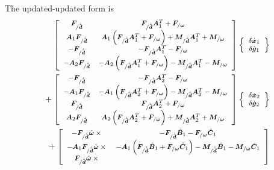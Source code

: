 \documentclass[10pt,dvips,fleqn,subeqn]{report}
\newcommand{\T}[1]{\bm{#1}}
\newcommand{\TT}[1]{\bm{#1}}
\begin{document}
The updated-updated form is
\begin{align}
	\footnotesize
	\sqbr{\matr{cc}{
		\T{F}_{/\dot{\tilde{\T{d}}}} 
		& \T{F}_{/\dot{\tilde{\T{d}}}} \TT{A}_1^T
			+ \T{F}_{/\T{\omega}}
		\\
%
		\TT{A}_1 \T{F}_{/\dot{\tilde{\T{d}}}} 
		& \TT{A}_1 \plbr{
			\T{F}_{/\dot{\tilde{\T{d}}}} \TT{A}_1^T
			+ \T{F}_{/\T{\omega}}
		}
			+ \T{M}_{/\dot{\tilde{\T{d}}}} \TT{A}_1^T
			+ \T{M}_{/\T{\omega}}
		\\
%
		- \T{F}_{/\dot{\tilde{\T{d}}}} 
		& - \T{F}_{/\dot{\tilde{\T{d}}}} \TT{A}_1^T
			- \T{F}_{/\T{\omega}}
		\\
%
		- \TT{A}_2 \T{F}_{/\dot{\tilde{\T{d}}}} 
		& - \TT{A}_2 \plbr{
			\T{F}_{/\dot{\tilde{\T{d}}}} \TT{A}_1^T
			+ \T{F}_{/\T{\omega}}
		}
			- \T{M}_{/\dot{\tilde{\T{d}}}} \TT{A}_1^T
			- \T{M}_{/\T{\omega}}
	}} \cubr{\cvvect{
		\delta\dot{\T{x}}_1 \\
		\delta\dot{\T{g}}_1
	}} & \nonumber \\
	\footnotesize
	\mbox{} + \sqbr{\matr{cc}{
		- \T{F}_{/\dot{\tilde{\T{d}}}}
		& - \T{F}_{/\dot{\tilde{\T{d}}}} \TT{A}_2^T
			- \T{F}_{/\T{\omega}}
		\\
%
		- \TT{A}_1 \T{F}_{/\dot{\tilde{\T{d}}}}
		& - \TT{A}_1 \plbr{
			\T{F}_{/\dot{\tilde{\T{d}}}} \TT{A}_2^T
			+ \T{F}_{/\T{\omega}}
		}
			- \T{M}_{/\dot{\tilde{\T{d}}}} \TT{A}_2^T
			- \T{M}_{/\T{\omega}}
		\\
%
		\T{F}_{/\dot{\tilde{\T{d}}}}
		& \T{F}_{/\dot{\tilde{\T{d}}}} \TT{A}_2^T
			+ \T{F}_{/\T{\omega}}
		\\
%
		\TT{A}_2 \T{F}_{/\dot{\tilde{\T{d}}}}
		& \TT{A}_2 \plbr{
			\T{F}_{/\dot{\tilde{\T{d}}}} \TT{A}_2^T
			+ \T{F}_{/\T{\omega}}
		}
			+ \T{M}_{/\dot{\tilde{\T{d}}}} \TT{A}_2^T
			+ \T{M}_{/\T{\omega}}
	}} \cubr{\cvvect{
		\delta\dot{\T{x}}_2 \\
		\delta\dot{\T{g}}_2
	}} & \nonumber \\
	\footnotesize
	\mbox{} + \sqbr{\matr{cc}{
		- \T{F}_{/\dot{\tilde{\T{d}}}} \hat{\T{\omega}}\times{}
		& - \T{F}_{/\dot{\tilde{\T{d}}}} \hat{\TT{B}}_1
			- \T{F}_{/\T{\omega}} \hat{\TT{C}}_1
		\\
%
		- \TT{A}_1 \T{F}_{/\dot{\tilde{\T{d}}}} \hat{\T{\omega}}\times{}
		& - \TT{A}_1 \plbr{
			\T{F}_{/\dot{\tilde{\T{d}}}} \hat{\TT{B}}_1
			+ \T{F}_{/\T{\omega}} \hat{\TT{C}}_1
		}
		- \T{M}_{/\dot{\tilde{\T{d}}}} \hat{\TT{B}}_1
			- \T{M}_{/\T{\omega}} \hat{\TT{C}}_1
		\\
%
		\T{F}_{/\dot{\tilde{\T{d}}}} \hat{\T{\omega}}\times{}
}}
\end{align}
\end{document}
